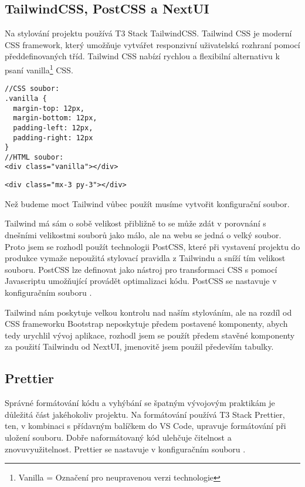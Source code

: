\subsection{TailwindCSS, PostCSS a NextUI}
Na stylování projektu používá T3 Stack TailwindCSS. Tailwind CSS je moderní CSS framework, který umožňuje vytvářet responzivní uživatelská rozhraní pomocí předdefinovaných tříd. Tailwind CSS nabízí rychlou a flexibilní alternativu k psaní vanilla\footnote{Vanilla = Označení pro neupravenou verzi technologie} CSS.
\begin{lstlisting}[caption={Ukázka stylování HTML prvku za použití vanilla CSS\cite{tailwind-example}}]
//CSS soubor:
.vanilla {
  margin-top: 12px,
  margin-bottom: 12px,
  padding-left: 12px,
  padding-right: 12px
}
//HTML soubor:
<div class="vanilla"></div>
\end{lstlisting}
\begin{lstlisting}[caption={Ukázka stylování HTML prvku za použití TailwindCSS\cite{tailwind-example}}]
    <div class="mx-3 py-3"></div>
\end{lstlisting}
Než budeme moct Tailwind vůbec použít musíme vytvořit konfigurační soubor\newline{}.

Tailwind má sám o sobě velikost přibližně  to se může zdát v porovnání s dnešními velikostmi souborů jako málo, ale na webu se jedná o velký soubor. Proto jsem se rozhodl použít technologii PostCSS, které při vystavení projektu do produkce vymaže nepoužitá stylovací pravidla z Tailwindu a sníží tím velikost souboru. PostCSS lze definovat jako nástroj pro transformaci CSS s pomocí Javascriptu umožňující provádět optimalizaci kódu. PostCSS se nastavuje v konfiguračním souboru .

Tailwind nám poskytuje velkou kontrolu nad naším stylováním, ale na rozdíl od CSS frameworku Bootstrap neposkytuje předem postavené komponenty, abych tedy urychlil vývoj aplikace, rozhodl jsem se použít předem stavěné komponenty za použití Tailwindu od NextUI\cite{nextui}, jmenovitě jsem použil především tabulky.

\subsection{Prettier}
Správné formátování kódu a vyhýbání se špatným vývojovým praktikám je důležitá část jakéhokoliv projektu. Na formátování používá T3 Stack Prettier, ten, v kombinaci s přídavným balíčkem do VS Code, upravuje formátování při uložení souboru. Dobře naformátovaný kód ulehčuje čitelnost a znovuvyužitelnost. Prettier se nastavuje v konfiguračním souboru .

